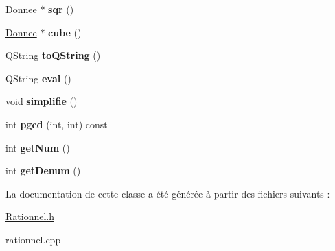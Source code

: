 \begin{DoxyCompactItemize}
\item 
\hypertarget{class_rationnel_af5d7713691e8624a8ff81a34b2b9162e}{\hyperlink{class_donnee}{Donnee} $\ast$ {\bfseries sqr} ()}\label{class_rationnel_af5d7713691e8624a8ff81a34b2b9162e}

\item 
\hypertarget{class_rationnel_a8fef62cad68d2d4446f274d5caab5555}{\hyperlink{class_donnee}{Donnee} $\ast$ {\bfseries cube} ()}\label{class_rationnel_a8fef62cad68d2d4446f274d5caab5555}

\item 
\hypertarget{class_rationnel_a73ea78d08750aca3308f6cc3268925e0}{Q\-String {\bfseries to\-Q\-String} ()}\label{class_rationnel_a73ea78d08750aca3308f6cc3268925e0}

\item 
\hypertarget{class_rationnel_a731572a3c0fbfdaa57fc67725a87c219}{Q\-String {\bfseries eval} ()}\label{class_rationnel_a731572a3c0fbfdaa57fc67725a87c219}

\item 
\hypertarget{class_rationnel_ab01e543bba8ce3fb12a2dbb7a070b6e7}{void {\bfseries simplifie} ()}\label{class_rationnel_ab01e543bba8ce3fb12a2dbb7a070b6e7}

\item 
\hypertarget{class_rationnel_a30e5bf832f0cae6ce689edbdefda37a4}{int {\bfseries pgcd} (int, int) const }\label{class_rationnel_a30e5bf832f0cae6ce689edbdefda37a4}

\item 
\hypertarget{class_rationnel_a12fb184a604bd42e6d2bd5deda395812}{int {\bfseries get\-Num} ()}\label{class_rationnel_a12fb184a604bd42e6d2bd5deda395812}

\item 
\hypertarget{class_rationnel_ab7b58c2e2c2d305dbdf077b23d89b379}{int {\bfseries get\-Denum} ()}\label{class_rationnel_ab7b58c2e2c2d305dbdf077b23d89b379}

\end{DoxyCompactItemize}


La documentation de cette classe a été générée à partir des fichiers suivants \-:\begin{DoxyCompactItemize}
\item 
\hyperlink{_rationnel_8h}{Rationnel.\-h}\item 
rationnel.\-cpp\end{DoxyCompactItemize}
